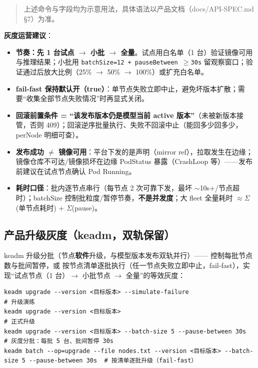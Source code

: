 \begin{quote}
上述命令与字段均为示意用法，具体语法以产品文档（docs/API-SPEC.md §7）为准。
\end{quote}

\textbf{灰度运营建议}：

\begin{itemize}
  \item \textbf{节奏：先 1 台试点 $\rightarrow$ 小批 $\rightarrow$ 全量}。试点用白名单（1 台）验证镜像可用与推理结果；小批用 \texttt{batchSize=12 + pauseBetween $\ge$30s} 留观察窗口；验证通过后放大比例（25\% $\rightarrow$ 50\% $\rightarrow$ 100\%）或扩充白名单。
  \item \textbf{fail-fast 保持默认开（true）}：单节点失败立即中止，避免坏版本扩散；需要“收集全部节点失败情况”时再显式关闭。
  \item \textbf{回滚前置条件 = “该发布版本仍是模型当前 active 版本”}（未被新版本接管，否则 409）；回滚逆序批量执行、失败不回滚中止（能回多少回多少，perNode 明细可查）。
  \item \textbf{发布成功 $\neq$ 镜像可用}：平台下发的是声明（mirror ref），拉取发生在边缘；镜像仓库不可达/镜像损坏在边缘 PodStatus 暴露（CrashLoop 等）——发布前建议在试点节点确认 Pod Running。
  \item \textbf{耗时口径}：批内逐节点串行（每节点 2 次可靠下发，最坏 $\sim$10s+/节点超时）；batchSize 控制批粒度/暂停节奏，\textbf{不是并发度}；大 fleet 全量耗时 $\approx \Sigma$(单节点耗时) + $\Sigma$(pause)。
\end{itemize}

\subsection{产品升级灰度（keadm，双轨保留）}

keadm 升级分批（节点\textbf{软件}升级，与模型版本发布双轨并行）—— 控制每批节点数与批间暂停，或  按节点清单逐批执行（任一节点失败立即中止，fail-fast），实现“试点节点（1 台）$\rightarrow$ 小批节点 $\rightarrow$ 全量”的等效灰度：

\begin{lstlisting}
keadm upgrade --version <目标版本> --simulate-failure                        # 升级演练
keadm upgrade --version <目标版本>                                           # 正式升级
keadm upgrade --version <目标版本> --batch-size 5 --pause-between 30s        # 灰度分批：每批 5 台、批间暂停 30s
keadm batch --op=upgrade --file nodes.txt --version <目标版本> --batch-size 5 --pause-between 30s  # 按清单逐批升级（fail-fast）
\end{lstlisting}

